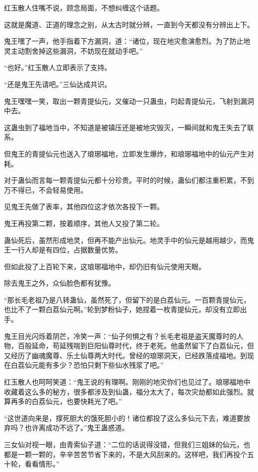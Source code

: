 \begin{this_body}
红玉散人住嘴不说，顾念局面，不想纠缠这个话题。

这就是魔道、正道的理念之别，从太古时就分辨，一直到今天都没有分辨出上下。

鬼王嘿了一声，他手指着下方漏洞，道：“诸位，现在地灾愈演愈烈。为了防止地灵主动割舍掉这些漏洞，不妨现在就动手吧。”

“也好。”红玉散人立即表示了支持。

“还是鬼王先请吧。”三仙达成共识。

鬼王嘿嘿一笑，取出一颗青提仙元，又催动一只蛊虫，叼起青提仙元，飞射到漏洞中去。

这蛊虫到了福地当中，不知道是被镇压还是被地灾毁灭，一瞬间就和鬼王失去了联系。

但鬼王的青提仙元也送入了琅琊福地，立即发生爆炸，和琅琊福地中的仙元产生对耗。

对于蛊仙而言每一颗青提仙元都十分珍贵。平时的时候，蛊仙们都注重积累，不到万不得已，不会轻易使用。

见鬼王先做了表率，其他四位这才依次各投下一颗。

鬼王再投第二颗，按着顺序，其他人又投了第二轮。

蛊仙死后，虽然形成地灵，但再不能产出仙元。地灵手中的仙元是越用越少，而鬼王一行人却是有四位，占据数量优势。

但如此投了上百轮下来，这琅琊福地中，却仍旧有仙元使用天眼。

除去鬼王之外，众仙脸色都有犹豫。

“那长毛老祖乃是八转蛊仙，虽然死了，但留下的是白荔仙元。一百颗青提仙元，也比不了一颗白荔仙元啊。”轮到梦粉仙子，她捏着一枚青提仙元，却没有立即出手。

鬼王目光闪烁着阴芒，冷笑一声：“仙子何惧之有？长毛老祖是盗天魔尊时的人物，百般延命，苟延残喘到巨阳仙尊时代，终于老死。他虽然留下了白荔仙元，但又经历了幽魂魔尊、乐土仙尊两大时代。曾经的琅琊洞天，已经跌落成福地。到现在白荔仙元能有多少？恐怕只剩下些仙水残浆了吧。”

红玉散人也呵呵笑道：“鬼王说的有理啊。刚刚的地灾你们也见过了。琅琊福地中收藏着这么多的秘方，很多都涉及到仙蛊，福分太大了，每次灾劫都如此强烈。就算再多的白荔仙元，也要快耗光了吧。”

“这世道向来是，撑死胆大的饿死胆小的！诸位都投了这么多仙元下去，难道要放弃吗？也许离成功不远了。”鬼王蛊惑道。

三女仙对视一眼，由青索仙子道：“二位的话说得没错，但我们三姐妹的仙元，也都是一颗一颗的，辛辛苦苦节省下来的，不是大风刮来的。这样吧，我们再投个五十轮，看看情形。”


\end{this_body}
